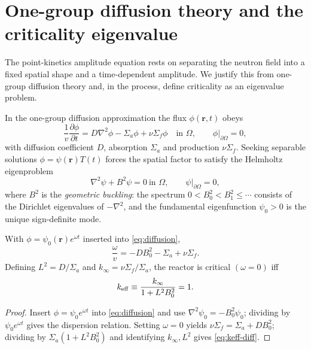 \section{One-group diffusion theory and the criticality eigenvalue}
\label{sec:diffusion}

The point-kinetics amplitude equation rests on separating the neutron field into a
fixed spatial shape and a time-dependent amplitude. We justify this from one-group
diffusion theory and, in the process, define criticality as an eigenvalue problem.

In the one-group diffusion approximation the flux $\phi(\mathbf r,t)$ obeys
\begin{equation}
\frac{1}{v}\frac{\partial \phi}{\partial t}
 = D\nabla^2\phi - \Sigma_a \phi + \nu\Sigma_f \phi
 \quad\text{in }\Omega,\qquad \phi|_{\partial\Omega}=0,
\label{eq:diffusion}
\end{equation}
with diffusion coefficient $D$, absorption $\Sigma_a$ and production $\nu\Sigma_f$.
Seeking separable solutions $\phi=\psi(\mathbf r)T(t)$ forces the spatial factor to
satisfy the Helmholtz eigenproblem
\begin{equation}
\nabla^2\psi + B^2\psi = 0 \ \text{in }\Omega,\qquad \psi|_{\partial\Omega}=0,
\label{eq:helmholtz}
\end{equation}
where $B^2$ is the \emph{geometric buckling}: the spectrum
$0<B_0^2<B_1^2\le\cdots$ consists of the Dirichlet eigenvalues of $-\nabla^2$, and
the fundamental eigenfunction $\psi_0>0$ is the unique sign-definite mode.

\begin{theorem}
\label{thm:crit}
With $\phi=\psi_0(\mathbf r)e^{\omega t}$ inserted into \eqref{eq:diffusion},
\begin{equation}
\frac{\omega}{v}= -DB_0^2-\Sigma_a+\nu\Sigma_f .
\end{equation}
Defining $L^2=D/\Sigma_a$ and $k_\infty=\nu\Sigma_f/\Sigma_a$, the reactor is
critical $(\omega=0)$ iff
\begin{equation}
k_{\mathrm{eff}} \equiv \frac{k_\infty}{1+L^2 B_0^2}=1 .
\label{eq:keff-diff}
\end{equation}
\end{theorem}
\begin{proof}
Insert $\phi=\psi_0e^{\omega t}$ into \eqref{eq:diffusion} and use
$\nabla^2\psi_0=-B_0^2\psi_0$; dividing by $\psi_0e^{\omega t}$ gives the
dispersion relation. Setting $\omega=0$ yields $\nu\Sigma_f=\Sigma_a+DB_0^2$;
dividing by $\Sigma_a(1+L^2B_0^2)$ and identifying $k_\infty,L^2$ gives
\eqref{eq:keff-diff}.
\end{proof}

